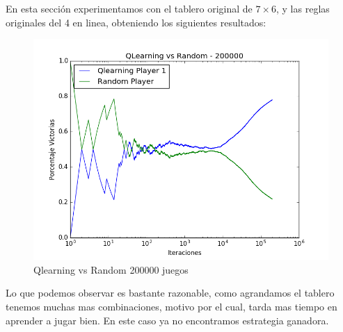 En esta sección experimentamos con el tablero original de $7\times6$, y las reglas originales del 4 en linea, obteniendo los siguientes resultados:\\







\begin{figure}[h]
 \centering
  \begin{minipage}[c]{1\textwidth}
	\centering
	\includegraphics[scale=0.5]{resultados/7x6/QlearningVsRandom_200000_7x6_parametros_informe.png}
        \caption{Qlearning vs Random 200000 juegos}
  \end{minipage}
\end{figure}

Lo que podemos observar es bastante razonable, como agrandamos el tablero tenemos muchas mas combinaciones, motivo por el cual, tarda mas tiempo en aprender a jugar bien.
En este caso ya no encontramos estrategia ganadora.


